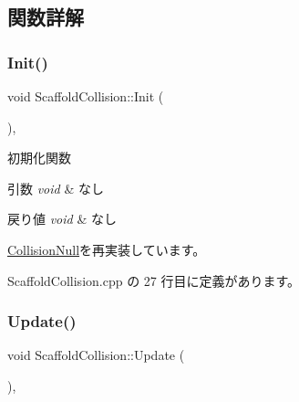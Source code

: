 \subsection{関数詳解}
\mbox{\label{class_scaffold_collision_a604bdd1c99a88a81820f5c57d683015a}} 
\subsubsection{\texorpdfstring{Init()}{Init()}}
{\footnotesize\ttfamily void Scaffold\+Collision\+::\+Init (\begin{DoxyParamCaption}{ }\end{DoxyParamCaption})\hspace{0.3cm}{\ttfamily [override]}, {\ttfamily [virtual]}}



初期化関数 


\begin{DoxyParams}{引数}
{\em void} & なし \\
\hline
\end{DoxyParams}

\begin{DoxyRetVals}{戻り値}
{\em void} & なし \\
\hline
\end{DoxyRetVals}


\mbox{\hyperlink{class_collision_null_a18cfc21fefcd3e8dec380ac44a85f111}{Collision\+Null}}を再実装しています。



 Scaffold\+Collision.\+cpp の 27 行目に定義があります。

\mbox{\label{class_scaffold_collision_ad57ee33c985c818f7f4a5af87a060e16}} 
\subsubsection{\texorpdfstring{Update()}{Update()}}
{\footnotesize\ttfamily void Scaffold\+Collision\+::\+Update (\begin{DoxyParamCaption}{ }\end{DoxyParamCaption})\hspace{0.3cm}{\ttfamily [override]}, {\ttfamily [virtual]}}



